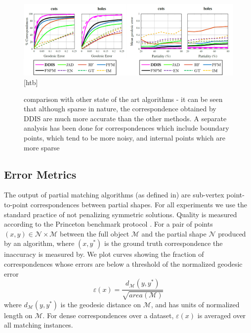 \documentclass[10pt,twocolumn,letterpaper]{article}
\begin{document}
\begin{figure}[htb]
	\centering

	\includegraphics[width=1\textwidth]{figures/ROCSHREC16.png}[htb]
	\caption{comparison with other state of the art algorithms - it can be seen that although sparse in nature, the correspondence obtained by DDIS are much more accurate than the other methods. 
		A separate analysis has been done for correspondences which include boundary points, which tend to be more noisy, and internal points which are more sparse}
\end{figure}

\subsection{Error Metrics}
The output of partial matching algorithms (as defined in\cite{cosmo2016shrec}) are sub-vertex point-to-point correspondences between partial shapes.
For all experiments we use the standard practice of not penalizing symmetric solutions. Quality is measured according to the Princeton benchmark protocol \cite{kim2011blended}. For a pair of points $(x,y)\in \mathcal{N}\times \mathcal{M}$ between the full object $\mathcal{M}$ and the partial shape $\mathcal{N}$ produced by an algorithm, where $(x,y^*)$ is the ground truth correspondence the inaccuracy is measured by. We plot curves showing the fraction of correspondences whose errors are below a threshold of the normalized geodesic error
\begin{equation}
\varepsilon(x)=\frac{d_{\mathcal{M}}(y,y^*)}{\sqrt{area(\mathcal{M})}}
\end{equation}
where $d_{\mathcal{M}}(y,y^*)$ is the geodesic distance on $\mathcal{M}$, and has units of normalized length on $\mathcal{M}$. For dense correspondences over a dataset, $\varepsilon(x)$ is averaged over all matching instances.
\end{document}
